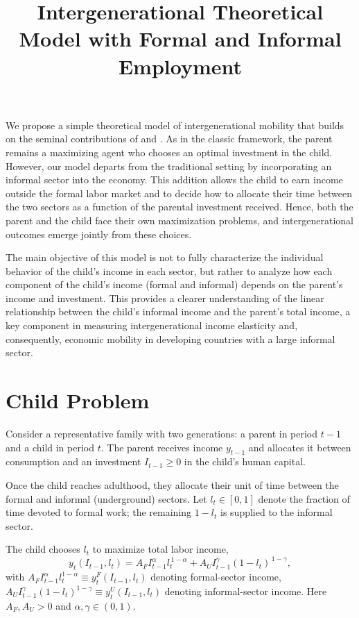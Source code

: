 \documentclass[12pt]{article}
\begin{document}
\title{Intergenerational Theoretical Model with Formal and Informal Employment}
\maketitle 

We propose a simple theoretical model of intergenerational mobility that builds on the seminal contributions of \textcite{Becker_Tomes_1979} and \textcite{Solon_1999}. As in the classic framework, the parent remains a maximizing agent who chooses an optimal investment in the child. However, our model departs from the traditional setting by incorporating an informal sector into the economy. This addition allows the child to earn income outside the formal labor market and to decide how to allocate their time between the two sectors as a function of the parental investment received. Hence, both the parent and the child face their own maximization problems, and intergenerational outcomes emerge jointly from these choices.

The main objective of this model is not to fully characterize the individual behavior of the child’s income in each sector, but rather to analyze how each component of the child’s income (formal and informal) depends on the parent’s income and investment. This provides a clearer understanding of the linear relationship  between the child’s informal income and the parent’s total income, a key component in measuring intergenerational income elasticity and, consequently, economic mobility in developing countries with a large informal sector.

\section*{Child Problem}
Consider a representative family with two generations: a parent in period $t-1$ and a child in period $t$. 
The parent receives income $y_{t-1}$ and allocates it between consumption and an investment $I_{t-1} \ge 0$ in the child’s human capital.

Once the child reaches adulthood, they allocate their unit of time between the formal and informal (underground) sectors. Let $l_t \in [0,1]$ denote the fraction of time devoted to formal work; the remaining $1 - l_t$ is supplied to the informal sector.

The child chooses $l_t$ to maximize total labor income,
\[
y_t(I_{t-1}, l_t)
= A_F I_{t-1}^{\alpha} l_t^{\,1-\alpha}
  + A_U I_{t-1}^{\gamma} (1-l_t)^{\,1-\gamma} ,
\]
with $A_F I_{t-1}^{\alpha} l_t^{1-\alpha} \equiv y_t^F(I_{t-1},l_t)$ denoting formal-sector income, 
$A_U I_{t-1}^{\gamma} (1-l_t)^{1-\gamma} \equiv y_t^U(I_{t-1},l_t)$ denoting informal-sector income. 
Here $A_F, A_U > 0$ and $\alpha, \gamma \in (0,1)$.
\end{document}
